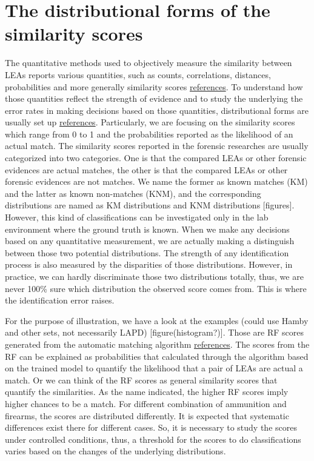 \documentclass[]{elsarticle} %
\begin{document}
\hypertarget{the-distributional-forms-of-the-similarity-scores}{%
\section{The distributional forms of the similarity
scores}\label{the-distributional-forms-of-the-similarity-scores}}

The quantitative methods used to objectively measure the similarity
between LEAs reports various quantities, such as counts, correlations,
distances, probabilities and more generally similarity scores
\protect\hyperlink{references}{references}. To understand how those
quantities reflect the strength of evidence and to study the underlying
the error rates in making decisions based on those quantities,
distributional forms are usually set up
\protect\hyperlink{references}{references}. Particularly, we are
focusing on the similarity scores which range from 0 to 1 and the
probabilities reported as the likelihood of an actual match. The
similarity scores reported in the forensic researches are usually
categorized into two categories. One is that the compared LEAs or other
forensic evidences are actual matches, the other is that the compared
LEAs or other forensic evidences are not matches. We name the former as
known matches (KM) and the latter as known non-matches (KNM), and the
corresponding distributions are named as KM distributions and KNM
distributions {[}figures{]}. However, this kind of classifications can
be investigated only in the lab environment where the ground truth is
known. When we make any decisions based on any quantitative measurement,
we are actually making a distinguish between those two potential
distributions. The strength of any identification process is also
measured by the disparities of those distributions. However, in
practice, we can hardly discriminate those two distributions totally,
thus, we are never 100\% sure which distribution the observed score
comes from. This is where the identification error raises.

For the purpose of illustration, we have a look at the examples (could
use Hamby and other sets, not necessarily LAPD)
{[}figure(histogram?){]}. Those are RF scores generated from the
automatic matching algorithm \protect\hyperlink{references}{references}.
The scores from the RF can be explained as probabilities that calculated
through the algorithm based on the trained model to quantify the
likelihood that a pair of LEAs are actual a match. Or we can think of
the RF scores as general similarity scores that quantify the
similarities. As the name indicated, the higher RF scores imply higher
chances to be a match. For different combination of ammunition and
firearms, the scores are distributed differently. It is expected that
systematic differences exist there for different cases. So, it is
necessary to study the scores under controlled conditions, thus, a
threshold for the scores to do classifications varies based on the
changes of the underlying distributions.
\end{document}
